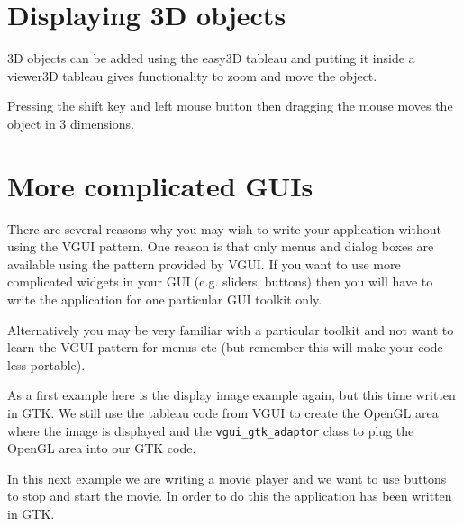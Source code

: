 \documentclass[12pt]{report}
\newcommand{\FSMinput}[1]{}
\begin{document}
\chapter{Displaying 3D objects}
3D objects can be added using the easy3D tableau and putting it inside a viewer3D tableau
gives functionality to zoom and move the object.

Pressing the shift key and left mouse button then dragging the mouse moves the object in
3 dimensions.
\FSMinput{3d-example}

\chapter{More complicated GUIs}

There are several reasons why you may wish to write your application without using
the VGUI pattern.  One reason is that only menus and dialog boxes are available using
the pattern provided by VGUI. If you want to use more complicated widgets in your
GUI (e.g. sliders, buttons) then you will have to write the application for one
particular GUI toolkit only.

Alternatively you may be very familiar with a particular toolkit and not want to learn
the VGUI pattern for menus etc (but remember this will make your code less portable).

As a first example here is the display image example again, but this time written in GTK.
We still use the tableau code from VGUI to create the OpenGL area where the image is
displayed and the {\tt vgui\_gtk\_adaptor} class to plug the OpenGL area into our GTK code.

\FSMinput{gtk-display-image}

In this next example we are writing a movie player and we want to use
buttons to stop and start the movie.  In order to do this the application
has been written in GTK.

\FSMinput{gtk-movie-player}
\end{document}
